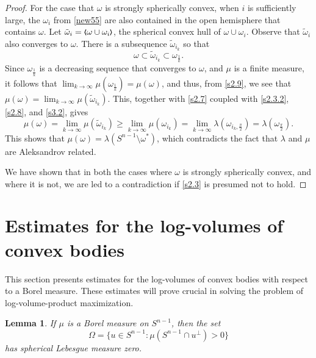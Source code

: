 \documentclass{cpamart1}     %
\newtheorem{lemm}[theo]{Lemma}
\theoremstyle{definition}
\theoremstyle{remark}
\newcommand{\sn}{S^{n-1}}
\newcommand{\bla}{\raise.2ex\hbox{$\scriptstyle\pmb \langle$}}
\newcommand{\bra}{\raise.2ex\hbox{$\scriptstyle\pmb \rangle$}}
\begin{document}
\begin{proof}
For the case that $\omega$ is strongly spherically convex, when $i$ is sufficiently large, the
$\omega_i$ from \eqref{new55} are also contained in the
open hemisphere that contains $\omega$.
Let $\tilde\omega_i = \bla \omega\cup\omega_i\bra$, the spherical convex hull of
$\omega\cup\omega_i$. Observe that $\tilde\omega_i$ also converges to $\omega$.
There is a subsequence $\tilde \omega_{i_k}$ so that
\begin{equation}\label{s2.9}
\omega \subset \tilde \omega_{i_k} \subset \omega_{\frac1k}.
\end{equation}
Since $\omega_{\frac1k}$ is a decreasing sequence that converges to $\omega$, and
$\mu$ is a finite measure, it follows that
$\lim_{k\to \infty} \mu(\omega_{\frac1k}) =\mu(\omega)$, and thus,
from \eqref{s2.9}, we see that $\mu(\omega) =\lim_{k\to\infty} \mu(\tilde\omega_{i_k})$.
This, together with
\eqref{s2.7} coupled with \eqref{s2.3.2}, \eqref{s2.8}, and \eqref{s3.2}, gives
\[
\mu(\omega) =\lim_{k\to\infty} \mu(\tilde\omega_{i_k}) \ge \lim_{k\to\infty}
\mu(\omega_{i_k}) = \lim_{k\to\infty} \lambda(\omega_{i_k, \frac\pi2})
=\lambda(\omega_{\frac\pi2}).
\]
This shows that $\mu(\omega)=\lambda(\sn\setminus\omega^*)$, which contradicts the fact that $\lambda$ and $\mu$ are Aleksandrov related.

We have shown that in both the cases where $\omega$ is strongly spherically convex, and where
it is not, we are led to a contradiction if \eqref{s2.3} is presumed not to hold.

\end{proof}








\section{Estimates for the log-volumes of convex bodies}


This section presents estimates for the log-volumes of convex bodies with respect
to a Borel measure. These estimates will prove crucial in solving the problem of log-volume-product maximization.


\begin{lemm}\label{e1.2}
If $\mu$ is a Borel measure  on $S^{n-1}$, then the set
\begin{equation*}
\Omega=\{u\in S^{n-1} : \mu(S^{n-1}\cap u^\bot)>0 \}
\end{equation*}
has spherical Lebesgue measure zero.
\end{lemm}
\end{document}
